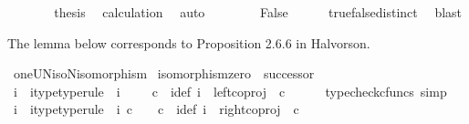 \begin{isabellebody}
\ \ \ \ \isamarkupfalse%
\ \isamarkupfalse%
\ {\isacharquery}{\kern0pt}thesis\ \isamarkupfalse%
\ calculation\ \isamarkupfalse%
\ auto\isanewline
\ \ \isamarkupfalse%
\isanewline
\ \ \isamarkupfalse%
\ \isamarkupfalse%
\ False\isanewline
\ \ \ \ \isamarkupfalse%
\ true{\isacharunderscore}{\kern0pt}false{\isacharunderscore}{\kern0pt}distinct\ \isamarkupfalse%
\ blast\isanewline
{}\isamarkupfalse%
%
\endisatagproof
{\isafoldproof}%
%
\isadelimproof
%
\endisadelimproof
%
\begin{isamarkuptext}%
The lemma below corresponds to Proposition 2.6.6 in Halvorson.%
\end{isamarkuptext}\isamarkuptrue%
\isamarkupfalse%
\ oneUN{\isacharunderscore}{\kern0pt}iso{\isacharunderscore}{\kern0pt}N{\isacharunderscore}{\kern0pt}isomorphism{\isacharcolon}{\kern0pt}\isanewline
\ {\isachardoublequoteopen}isomorphism{\isacharparenleft}{\kern0pt}zero\ {\isasymamalg}\ successor{\isacharparenright}{\kern0pt}{\isachardoublequoteclose}\ \isanewline
%
\isadelimproof
%
\endisadelimproof
%
\isatagproof
{}\isamarkupfalse%
\ {\isacharminus}{\kern0pt}\ \isanewline
\ \ \isamarkupfalse%
\ i{}\ \ i{}{\isacharunderscore}{\kern0pt}type{\isacharbrackleft}{\kern0pt}type{\isacharunderscore}{\kern0pt}rule{\isacharbrackright}{\kern0pt}{\isacharcolon}{\kern0pt}\ \ {\isachardoublequoteopen}i{}{\isacharcolon}{\kern0pt}\ {\isasymone}\ {\isasymrightarrow}\ {\isacharparenleft}{\kern0pt}{\isasymone}\ {\isasymCoprod}\ {\isasymnat}\isactrlsub c{\isacharparenright}{\kern0pt}{\isachardoublequoteclose}\ \ i{}{\isacharunderscore}{\kern0pt}def{\isacharcolon}{\kern0pt}\ {\isachardoublequoteopen}i{}\ {\isacharequal}{\kern0pt}\ left{\isacharunderscore}{\kern0pt}coproj\ {\isasymone}\ {\isasymnat}\isactrlsub c{\isachardoublequoteclose}\isanewline
\ \ \ \ \isamarkupfalse%
\ {\isacharparenleft}{\kern0pt}typecheck{\isacharunderscore}{\kern0pt}cfuncs{\isacharcomma}{\kern0pt}\ simp{\isacharparenright}{\kern0pt}\isanewline
\ \ \isamarkupfalse%
\ i{}\ \ i{}{\isacharunderscore}{\kern0pt}type{\isacharbrackleft}{\kern0pt}type{\isacharunderscore}{\kern0pt}rule{\isacharbrackright}{\kern0pt}{\isacharcolon}{\kern0pt}\ \ {\isachardoublequoteopen}i{}{\isacharcolon}{\kern0pt}\ {\isasymnat}\isactrlsub c\ {\isasymrightarrow}\ {\isacharparenleft}{\kern0pt}{\isasymone}\ {\isasymCoprod}\ {\isasymnat}\isactrlsub c{\isacharparenright}{\kern0pt}{\isachardoublequoteclose}\ \ i{}{\isacharunderscore}{\kern0pt}def{\isacharcolon}{\kern0pt}\ {\isachardoublequoteopen}i{}\ {\isacharequal}{\kern0pt}\ right{\isacharunderscore}{\kern0pt}coproj\ {\isasymone}\ {\isasymnat}\isactrlsub c{\isachardoublequoteclose}\isanewline

\end{isabellebody}
